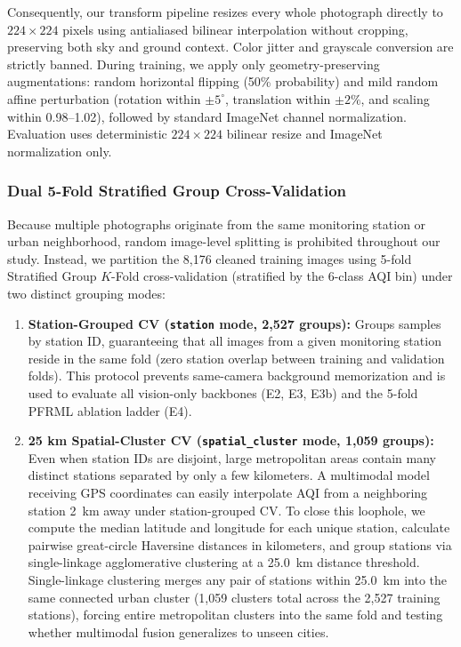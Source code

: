 \documentclass[conference]{IEEEtran}
\begin{document}
Consequently, our transform pipeline resizes every whole photograph directly to
$224 \times 224$ pixels using antialiased bilinear interpolation without
cropping, preserving both sky and ground context. Color jitter and grayscale
conversion are strictly banned. During training, we apply only
geometry-preserving augmentations: random horizontal flipping (50\% probability)
and mild random affine perturbation (rotation within $\pm 5^\circ$, translation
within $\pm 2\%$, and scaling within 0.98--1.02), followed by standard ImageNet
channel normalization. Evaluation uses deterministic $224 \times 224$ bilinear
resize and ImageNet normalization only.

\subsubsection{Dual 5-Fold Stratified Group Cross-Validation}

Because multiple photographs originate from the same monitoring station or urban
neighborhood, random image-level splitting is prohibited throughout our study.
Instead, we partition the 8,176 cleaned training images using 5-fold Stratified
Group $K$-Fold cross-validation (stratified by the 6-class AQI bin) under two
distinct grouping modes:
\begin{enumerate}
  \item \textbf{Station-Grouped CV (\texttt{station} mode, 2,527 groups):}
        Groups samples by station ID, guaranteeing that all images from a given
        monitoring station reside in the same fold (zero station overlap between
        training and validation folds). This protocol prevents same-camera
        background memorization and is used to evaluate all vision-only
        backbones (E2, E3, E3b) and the 5-fold PFRML ablation ladder (E4).
  \item \textbf{25 km Spatial-Cluster CV (\texttt{spatial\_cluster} mode, 1,059
        groups):} Even when station IDs are disjoint, large metropolitan areas
        contain many distinct stations separated by only a few kilometers. A
        multimodal model receiving GPS coordinates can easily interpolate AQI
        from a neighboring station 2~km away under station-grouped CV. To close
        this loophole, we compute the median latitude and longitude for each
        unique station, calculate pairwise great-circle Haversine distances in
        kilometers, and group stations via single-linkage agglomerative
        clustering at a 25.0~km distance threshold. Single-linkage clustering
        merges any pair of stations within 25.0~km into the same connected urban
        cluster (1,059 clusters total across the 2,527 training stations),
        forcing entire metropolitan clusters into the same fold and testing
        whether multimodal fusion generalizes to unseen cities.
\end{enumerate}
\end{document}
